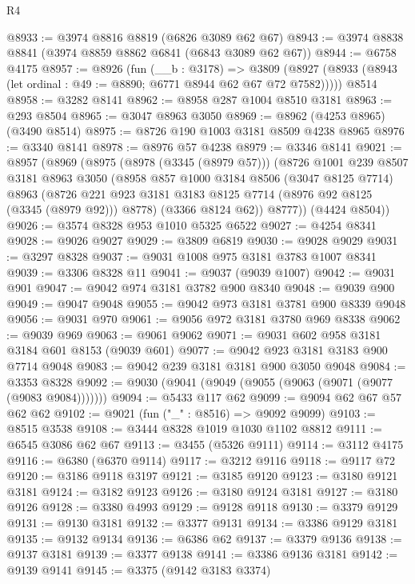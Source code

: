 \begin{lexlean}{R4}
\begin{coremodule}
@8933 := @3974 @8816 @8819 (@6826 @3089 @62 @67)
@8943 := @3974 @8838 @8841 (@3974 @8859 @8862 @6841 (@6843 @3089 @62 @67))
@8944 := @6758 @4175
@8957 := @8926
    (fun (__b : @3178) =>
    @3809 (@8927 (@8933 (@8943 (let ordinal : @49 := @8890; @6771 @8944 @62 @67 @72 @7582)))))
    @8514
@8958 := @3282 @8141
@8962 := @8958 @287 @1004 @8510 @3181
@8963 := @293 @8504
@8965 := @3047 @8963 @3050
@8969 := @8962 (@4253 @8965) (@3490 @8514)
@8975 := @8726 @190 @1003 @3181 @8509 @4238 @8965
@8976 := @3340 @8141
@8978 := @8976 @57 @4238
@8979 := @3346 @8141
@9021 := @8957
    (@8969
      (@8975
        (@8978 (@3345 (@8979 @57)))
        (@8726
          @1001
          @239
          @8507
          @3181
          @8963
          @3050
          (@8958
            @857
            @1000
            @3184
            @8506
            (@3047 @8125 @7714)
            @8963
            (@8726 @221 @923 @3181 @3183 @8125 @7714 (@8976 @92 @8125 (@3345 (@8979 @92))) @8778)
            (@3366 @8124 @62))
          @8777))
      (@4424 @8504))
@9026 := @3574 @8328 @953 @1010 @5325 @6522
@9027 := @4254 @8341
@9028 := @9026 @9027
@9029 := @3809 @6819
@9030 := @9028 @9029
@9031 := @3297 @8328
@9037 := @9031 @1008 @975 @3181 @3783 @1007 @8341
@9039 := @3306 @8328 @11
@9041 := @9037 (@9039 @1007)
@9042 := @9031 @901
@9047 := @9042 @974 @3181 @3782 @900 @8340
@9048 := @9039 @900
@9049 := @9047 @9048
@9055 := @9042 @973 @3181 @3781 @900 @8339 @9048
@9056 := @9031 @970
@9061 := @9056 @972 @3181 @3780 @969 @8338
@9062 := @9039 @969
@9063 := @9061 @9062
@9071 := @9031 @602 @958 @3181 @3184 @601 @8153 (@9039 @601)
@9077 := @9042 @923 @3181 @3183 @900 @7714 @9048
@9083 := @9042 @239 @3181 @3181 @900 @3050 @9048
@9084 := @3353 @8328
@9092 := @9030 (@9041 (@9049 (@9055 (@9063 (@9071 (@9077 (@9083 @9084)))))))
@9094 := @5433 @117 @62
@9099 := @9094 @62 @67 @57 @62 @62
@9102 := @9021 (fun ("_" : @8516) => @9092 @9099)
@9103 := @8515 @3538
@9108 := @3444 @8328 @1019 @1030 @1102 @8812
@9111 := @6545 @3086 @62 @67
@9113 := @3455 (@5326 @9111)
@9114 := @3112 @4175
@9116 := @6380 (@6370 @9114)
@9117 := @3212 @9116
@9118 := @9117 @72
@9120 := @3186 @9118 @3197
@9121 := @3185 @9120
@9123 := @3180 @9121 @3181
@9124 := @3182 @9123
@9126 := @3180 @9124 @3181
@9127 := @3180 @9126
@9128 := @3380 @4993
@9129 := @9128 @9118
@9130 := @3379 @9129
@9131 := @9130 @3181
@9132 := @3377 @9131
@9134 := @3386 @9129 @3181
@9135 := @9132 @9134
@9136 := @6386 @62
@9137 := @3379 @9136
@9138 := @9137 @3181
@9139 := @3377 @9138
@9141 := @3386 @9136 @3181
@9142 := @9139 @9141
@9145 := @3375 (@9142 @3183 @3374)

\end{coremodule}
\end{lexlean}
